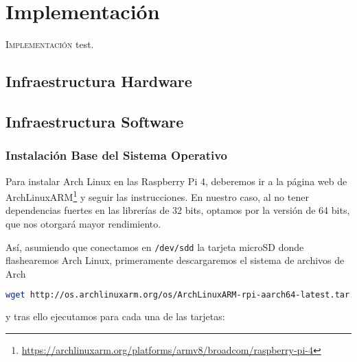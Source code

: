 \chapter{Implementación}
\label{chap:implementacion}

\lettrine{I}{mplementación} test.

\section{Infraestructura Hardware}
\label{sec:impl_infra_hardware}

\section{Infraestructura Software}
\label{sec:impl_infra_software}

\subsection{Instalación Base del Sistema Operativo}
\label{ssec:instalacion_sistema_operativo}
Para instalar Arch Linux en las Raspberry Pi 4, deberemos ir a la página web de ArchLinuxARM\footnote{\url{https://archlinuxarm.org/platforms/armv8/broadcom/raspberry-pi-4}} y seguir las instrucciones. En nuestro caso, al no tener dependencias fuertes en las librerías de 32 bits, optamos por la versión de 64 bits, que nos otorgará mayor rendimiento.

Así, asumiendo que conectamos en \texttt{/dev/sdd} la tarjeta microSD donde flashearemos Arch Linux, primeramente descargaremos el sistema de archivos de Arch

\begin{lstlisting}[language=bash,basicstyle=\scriptsize]
wget http://os.archlinuxarm.org/os/ArchLinuxARM-rpi-aarch64-latest.tar.gz
\end{lstlisting}

y tras ello ejecutamos para cada una de las tarjetas:

